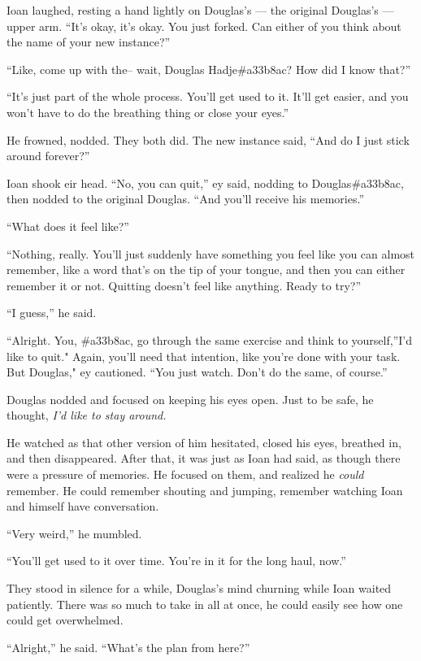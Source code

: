 Ioan laughed, resting a hand lightly on Douglas's — the original Douglas's — upper arm. ``It's okay, it's okay. You just forked. Can either of you think about the name of your new instance?''

``Like, come up with the-- wait, Douglas Hadje\#a33b8ac? How did I know that?''

``It's just part of the whole process. You'll get used to it. It'll get easier, and you won't have to do the breathing thing or close your eyes.''

He frowned, nodded. They both did. The new instance said, ``And do I just stick around forever?''

Ioan shook eir head. ``No, you can quit,'' ey said, nodding to Douglas\#a33b8ac, then nodded to the original Douglas. ``And you'll receive his memories.''

``What does it feel like?''

``Nothing, really. You'll just suddenly have something you feel like you can almost remember, like a word that's on the tip of your tongue, and then you can either remember it or not. Quitting doesn't feel like anything. Ready to try?''

``I guess,'' he said.

``Alright. You, \#a33b8ac, go through the same exercise and think to yourself,''I'd like to quit." Again, you'll need that intention, like you're done with your task. But Douglas," ey cautioned. ``You just watch. Don't do the same, of course.''

Douglas nodded and focused on keeping his eyes open. Just to be safe, he thought, \emph{I'd like to stay around.}

He watched as that other version of him hesitated, closed his eyes, breathed in, and then disappeared. After that, it was just as Ioan had said, as though there were a pressure of memories. He focused on them, and realized he \emph{could} remember. He could remember shouting and jumping, remember watching Ioan and himself have conversation.

``Very weird,'' he mumbled.

``You'll get used to it over time. You're in it for the long haul, now.''

They stood in silence for a while, Douglas's mind churning while Ioan waited patiently. There was so much to take in all at once, he could easily see how one could get overwhelmed.

``Alright,'' he said. ``What's the plan from here?''

